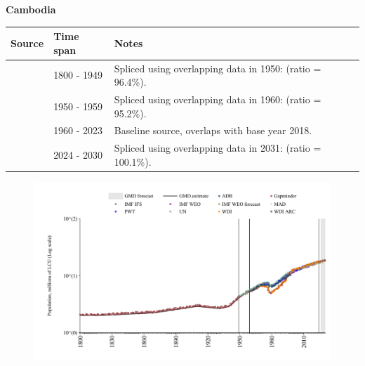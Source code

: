 \documentclass[12pt,a4paper,landscape]{article}
\begin{document}
\begin{adjustbox}{max totalsize={\paperwidth}{\paperheight},center}
\begin{minipage}[t][\textheight][t]{\textwidth}
\vspace*{0.5cm}
{}
\begin{center}
{\Large\bfseries Cambodia}
\end{center}
\vspace{0.5cm}
\begin{table}[H]
\centering
\small
\begin{tabular}{|l|l|l|}
\hline
\textbf{Source} & \textbf{Time span} & \textbf{Notes} \\
\hline
\rowcolor{white}\cite{Gapminder}& 1800 - 1949 &Spliced using overlapping data in 1950: (ratio = 96.4\%).\\
\rowcolor{lightgray}\cite{IMF_IFS}& 1950 - 1959 &Spliced using overlapping data in 1960: (ratio = 95.2\%).\\
\rowcolor{white}\cite{WDI}& 1960 - 2023 &Baseline source, overlaps with base year 2018.\\
\rowcolor{lightgray}\cite{Gapminder}& 2024 - 2030 &Spliced using overlapping data in 2031: (ratio = 100.1\%).\\
\hline
\end{tabular}
\end{table}
\begin{figure}[H]
\centering
\includegraphics[width=\textwidth,height=0.6\textheight,keepaspectratio]{graphs/KHM_pop.pdf}
\end{figure}
\end{minipage}
\end{adjustbox}
\end{document}
